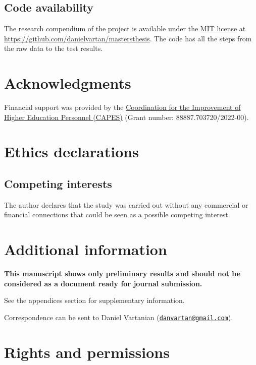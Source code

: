 \documentclass[
12pt,
openright,
oneside,
a4paper,
chapter=TITLE,
section=TITLE,
french,
spanish,
brazil,
english
]{abntex2}\usepackage{array}
\begin{document}
\subsection{Code availability}\label{code-availability}

The research compendium of the project is available under the
\href{https://opensource.org/license/mit/}{MIT license} at
\url{https://github.com/danielvartan/mastersthesis}. The code has all
the steps from the raw data to the test results.

\section{Acknowledgments}\label{acknowledgments}

Financial support was provided by the
\href{https://www.gov.br/capes/}{Coordination for the Improvement of
Higher Education Personnel (CAPES)} (Grant number:
88887.703720/2022-00).

\section{Ethics declarations}\label{ethics-declarations}

\subsection{Competing interests}\label{competing-interests}

The author declares that the study was carried out without any
commercial or financial connections that could be seen as a possible
competing interest.

\section{Additional information}\label{additional-information}

\textbf{This manuscript shows only preliminary results and should not be
considered as a document ready for journal submission.}

See the appendices section for supplementary information.

Correspondence can be sent to Daniel Vartanian
(\href{mailto:danvartan@gmail.com}{\nolinkurl{danvartan@gmail.com}}).

\section{Rights and permissions}\label{rights-and-permissions}
\end{document}
